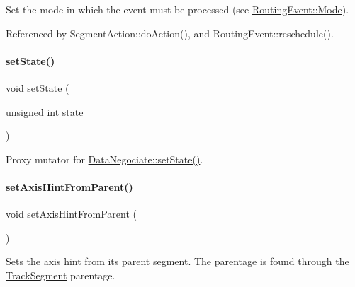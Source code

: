 Set the mode in which the event must be processed (see \hyperlink{classKite_1_1RoutingEvent_a46c8a310cf4c094f8c80e1cb8dc1f911}{Routing\+Event\+::\+Mode}). 

Referenced by Segment\+Action\+::do\+Action(), and Routing\+Event\+::reschedule().

\mbox{\label{classKite_1_1RoutingEvent_af7ce7f73feb28f3df8f3180632a2f731}} 
\paragraph{\texorpdfstring{set\+State()}{setState()}}
{\footnotesize\ttfamily void set\+State (\begin{DoxyParamCaption}\item[{unsigned int}]{state }\end{DoxyParamCaption})}

Proxy mutator for \hyperlink{classKite_1_1DataNegociate_aafc8cd0dcd351625a12904bed7d5a7d1}{Data\+Negociate\+::set\+State()}. \mbox{\label{classKite_1_1RoutingEvent_a02a3f1f2801d4ebbbe676e062878faae}} 
\paragraph{\texorpdfstring{set\+Axis\+Hint\+From\+Parent()}{setAxisHintFromParent()}}
{\footnotesize\ttfamily void set\+Axis\+Hint\+From\+Parent (\begin{DoxyParamCaption}{ }\end{DoxyParamCaption})}

Sets the axis hint from it\textquotesingle{}s parent segment. The parentage is found through the \hyperlink{classKite_1_1TrackSegment}{Track\+Segment} parentage. \mbox{\label{classKite_1_1RoutingEvent_a86c4b1b3d406c12667188ad44ce366db}} 
